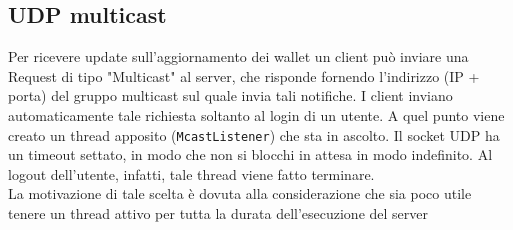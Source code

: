 \subsection{UDP multicast}
Per ricevere update sull'aggiornamento dei wallet un client può inviare una Request di tipo "Multicast"
al server, che risponde fornendo l'indirizzo (IP + porta) del gruppo multicast sul quale invia tali notifiche.
I client inviano automaticamente tale richiesta soltanto al login di un utente. A quel punto viene creato un thread
apposito (\verb|McastListener|) che sta in ascolto. Il socket UDP ha un timeout settato, in modo che non si blocchi in attesa
in modo indefinito. Al logout dell'utente, infatti, tale thread viene fatto terminare.\\
La motivazione di tale scelta è dovuta alla considerazione che sia poco utile tenere un thread attivo per tutta la durata
dell'esecuzione del server